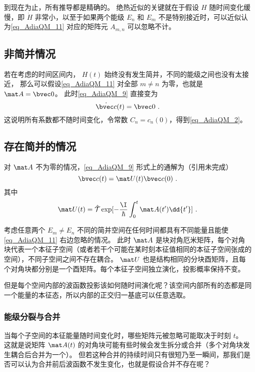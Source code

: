 到现在为止，所有推导都是精确的。 绝热近似的关键就在于假设 $H$ 随时间变化缓慢，即 $\dot H$ 非常小，以至于如果两个能级 $E_n$ 和 $E_m$ 不是特别接近时，可以近似认为\autoref{eq_AdiaQM_11} 对应的矩阵元 $A_{m,n}$ 可以忽略不计。

\subsection{非简并情况}
若在考虑的时间区间内， $H(t)$ 始终没有发生简并，不同的能级之间也没有太接近， 那么可以假设\autoref{eq_AdiaQM_11} 对全部 $m\ne n$ 为零，也就是 $\mat A = \bvec 0$。 此时\autoref{eq_AdiaQM_9} 直接变为
\begin{equation}
\dot{\bvec c}(t) = \bvec 0~.
\end{equation}
这说明所有系数都不随时间变化，令常数 $C_n = c_n(0)$，得到\autoref{eq_AdiaQM_2}。

\subsection{存在简并的情况}
对 $\mat A$ 不为零的情况，\autoref{eq_AdiaQM_9} 形式上的通解为（引用未完成）
\begin{equation}
\bvec c(t) = \mat U(t)\bvec c(0)~.
\end{equation}
其中
\begin{equation}
\mat U(t) = \hat{\mathcal{T}}\exp[-\frac{\I}{\hbar}\int_0^t \mat A(t') \dd{t'}]~.
\end{equation}

考虑任意两个 $E_m\ne E_n$ 不同的简并空间在任何时间都具有不同能量且能使\autoref{eq_AdiaQM_11} 右边忽略的情况。 此时 $\mat A$ 是块对角厄米矩阵，每个对角块代表一个本征子空间（或者若干个可能在某时刻本征值相同的本征子空间张成的空间），不同子空间之间不存在耦合。 $\mat U$ 也是结构相同的分块酉矩阵，且每个对角块都分别是一个酉矩阵。每个本征子空间独立演化，投影概率保持不变。

但是每个空间内部的波函数投影该如何随时间演化呢？该空间内部所有的态都是同一个能量的本征态，所以内部的正交归一基底可以任意选取。

\subsubsection{能级分裂与合并}
当每个子空间的本征能量随时间变化时，哪些矩阵元被忽略可能取决于时刻 $t$。 这就是说矩阵 $\mat A(t)$ 的对角块可能有些时候会发生拆分或合并（多个对角块发生耦合后合并为一个）。 但若这种合并的持续时间只有很短乃至一瞬间，那我们是否可以认为合并前后波函数不发生变化，也就是假设合并不存在呢？

